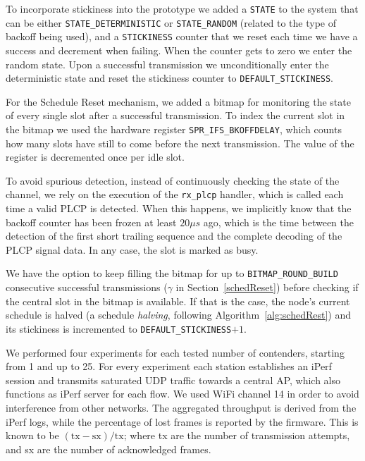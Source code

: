 To incorporate stickiness into the prototype we added a {\tt STATE} to the system that can be either {\tt STATE\_DETERMINISTIC} or {\tt STATE\_RANDOM} (related to the type of backoff being used), and a {\tt STICKINESS} counter that we reset each time we have a success and decrement when failing. When the counter gets to zero we enter the random state. Upon a successful transmission we unconditionally enter the deterministic state and reset the stickiness counter to {\tt DEFAULT\_STICKINESS}.

For the Schedule Reset mechanism, we added a bitmap for monitoring the state of every single slot after a successful transmission. To index the current slot in the bitmap we used the hardware register {\tt SPR\_IFS\_BKOFFDELAY}, which counts how many slots have still to come before the next transmission. The value of the register is decremented once per idle slot.

To avoid spurious detection, instead of continuously checking the state of the channel, we rely on the execution of the {\tt rx\_plcp} handler, which is called each time a valid PLCP is detected. When this happens, we implicitly know that the backoff counter has been frozen at least $20\mu s$ ago, which is the time between the detection of the first short trailing sequence and the complete decoding of the PLCP signal data. In any case, the slot is marked as busy.

We have the option to keep filling the bitmap for up to {\tt BITMAP\_ROUND\_BUILD} consecutive successful transmissions ($\gamma$ in Section~\ref{schedReset}) before checking if the central slot in the bitmap is available. If that is the case, the node's current schedule is halved (a schedule \emph{halving}, following Algorithm~\ref{alg:schedRest}) and its stickiness is incremented to {\tt DEFAULT\_STICKINESS}$+1$.

We performed four experiments for each tested number of contenders, starting from 1 and up to 25. For every experiment each station establishes an iPerf~\cite{tirumala2005iperf} session and transmits saturated UDP traffic towards a central AP, which also functions as iPerf server for each flow. We used WiFi channel 14  in order to avoid interference from other networks. The aggregated throughput is derived from the iPerf logs, while the percentage of lost frames is reported by the firmware. This is known to be $(\text{tx}-\text{sx})/\text{tx}$; where tx are the number of transmission attempts, and sx are the number of acknowledged frames.

